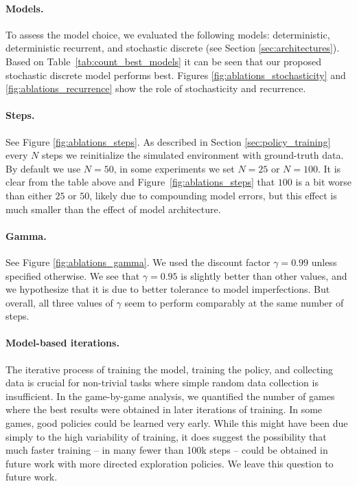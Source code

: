 \paragraph{Models.} To assess the model choice, we evaluated the following models: deterministic, deterministic recurrent, and stochastic discrete (see Section \ref{sec:architectures}). Based on Table~\ref{tab:count_best_models} it can be seen that our proposed stochastic discrete model performs best. Figures \ref{fig:ablations_stochasticity} and \ref{fig:ablations_recurrence} show the role of stochasticity and recurrence.  

\paragraph{Steps.} See Figure \ref{fig:ablations_steps}. As described in Section \ref{sec:policy_training} every $N$ steps we reinitialize the simulated environment with ground-truth data. By default we use $N=50$, in some experiments 
we set $N=25$ or $N=100$. It is clear from the table above and Figure~\ref{fig:ablations_steps} that $100$ is a bit worse than either $25$ or $50$, likely due to compounding model errors,
but this effect is much smaller than the effect of model architecture.

\paragraph{Gamma.} See Figure \ref{fig:ablations_gamma}. We used the discount factor $\gamma=0.99$ unless specified otherwise.  We see that $\gamma=0.95$ is slightly better than other values, and we hypothesize that it is due to better tolerance to model imperfections. But overall, all three values of $\gamma$ seem to perform comparably at the same number of steps.

\paragraph{Model-based iterations.}
The iterative process of training the model, training the policy, and collecting data is crucial for non-trivial tasks where simple random data collection is insufficient. In the game-by-game analysis, we quantified the number of games where the best results were obtained in later iterations of training. In some games, good policies could be learned very early. While this might have been due simply to the high variability of training, it does suggest the possibility that much faster training -- in many fewer than 100k steps -- could be obtained in future work with more directed exploration policies. We leave this question to future work.

